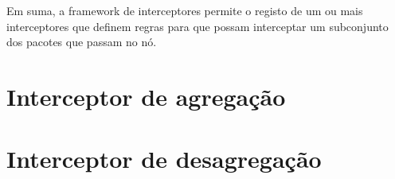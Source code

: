 \documentclass[10pt,a4paper,oneside]{book}
\begin{document}
  Em suma, a framework de interceptores permite o registo de um ou mais interceptores que definem regras para que possam interceptar um subconjunto dos pacotes que passam no nó.

  
  \section{Interceptor de agregação} 
  \section{Interceptor de desagregação} 
\end{document}
